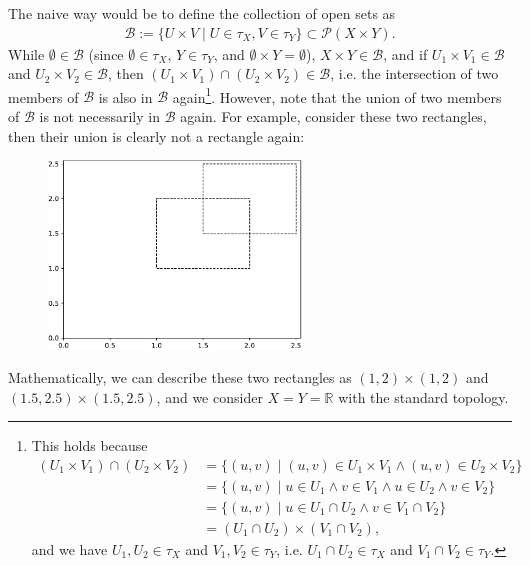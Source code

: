 \begin{remark}
	The naive way would be to define the collection of open sets as 
	\begin{align}\label{eq:basis_product_topology}
		\mathscr B := \{ U\times V \mid U\in\tau_X, V\in\tau_Y \}\subset \mathcal P(X\times Y).
	\end{align}
	While $\emptyset\in\mathscr B$ (since $\emptyset\in \tau_X$, $Y\in \tau_Y$, and $\emptyset\times Y = \emptyset$), $X\times Y \in \mathscr B$, and if $U_1\times V_1\in\mathscr B$ and $U_2\times V_2\in\mathscr B$, then $(U_1\times V_1) \cap (U_2\times V_2)\in\mathscr B$, i.e. the intersection of two members of $\mathscr B$ is also in $\mathscr B$ again\footnote{This holds because 
		\begin{align*}
			(U_1 \times V_1) \cap (U_2\times V_2) &= \{(u, v) \mid (u, v)\in U_1\times V_1 \wedge (u, v)\in U_2\times V_2 \} \\ &= \{(u, v) \mid u\in U_1\wedge v\in V_1\wedge u\in U_2\wedge v\in V_2\}
			\\ &= \{(u, v)\mid u\in U_1\cap U_2 \wedge v\in V_1\cap V_2\}
			\\ &= (U_1\cap U_2) \times (V_1\cap V_2),
		\end{align*}
		and we have $U_1, U_2\in\tau_X$ and $V_1, V_2\in\tau_Y$, i.e. $U_1\cap U_2\in\tau_X$ and $V_1\cap V_2\in \tau_Y$.
	}. However, note that the union of two members of $\mathscr B$ is not necessarily in $\mathscr B$ again. For example, consider these two rectangles, then their union is clearly not a rectangle again:
	\begin{figure}[h!]
		\centering 
		\includegraphics[width=0.6\textwidth]{scripts/rectangles.pdf}
	\end{figure}
	
	Mathematically, we can describe these two rectangles as $(1, 2) \times (1, 2)$ and $(1.5, 2.5) \times (1.5, 2.5)$, and we consider $X = Y = \mathbb R$ with the standard topology.
\end{remark}

